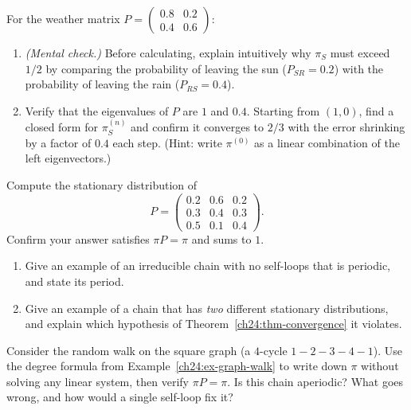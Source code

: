 \begin{exercise}
\label{ch24:ex-two-state-mixing}
For the weather matrix $P=\left(\begin{smallmatrix}0.8 & 0.2\\ 0.4 & 0.6\end{smallmatrix}\right)$:
\begin{enumerate}[label=(\alph*)]
  \item \emph{(Mental check.)} Before calculating, explain intuitively why $\pi_S$
    must exceed $1/2$ by comparing the probability of leaving the sun ($P_{SR}=0.2$)
    with the probability of leaving the rain ($P_{RS}=0.4$).
  \item Verify that the eigenvalues of $P$ are $1$ and $0.4$. Starting from $(1,0)$,
    find a closed form for $\pi^{(n)}_S$ and confirm it converges to $2/3$ with the
    error shrinking by a factor of $0.4$ each step. (Hint: write $\pi^{(0)}$ as a
    linear combination of the left eigenvectors.)
\end{enumerate}
\end{exercise}

\begin{exercise}
\label{ch24:ex-find-stationary}
Compute the stationary distribution of
\[
  P = \begin{pmatrix} 0.2 & 0.6 & 0.2 \\ 0.3 & 0.4 & 0.3 \\ 0.5 & 0.1 & 0.4 \end{pmatrix}.
\]
Confirm your answer satisfies $\pi P = \pi$ and sums to $1$.
\end{exercise}

\begin{exercise}
\label{ch24:ex-reducible-periodic}
\begin{enumerate}[label=(\alph*)]
  \item Give an example of an irreducible chain with no self-loops that is periodic,
    and state its period.
  \item Give an example of a chain that has \emph{two} different stationary distributions,
    and explain which hypothesis of Theorem~\ref{ch24:thm-convergence} it violates.
\end{enumerate}
\end{exercise}

\begin{exercise}
\label{ch24:ex-graph-walk-exercise}
Consider the random walk on the square graph (a $4$-cycle $1\!-\!2\!-\!3\!-\!4\!-\!1$).
Use the degree formula from Example~\ref{ch24:ex-graph-walk} to write down $\pi$
without solving any linear system, then verify $\pi P = \pi$. Is this chain
aperiodic? What goes wrong, and how would a single self-loop fix it?
\end{exercise}

